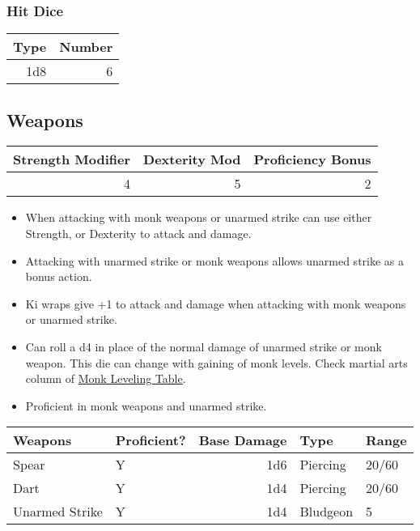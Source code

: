 \documentclass[11pt]{article}
\begin{document}
\subsubsection{Hit Dice}
\label{sec:org7c2fcab}

\begin{center}
\label{tab:orga5cebc1}
\begin{tabular}{rr}
Type & Number\\
\hline
1d8 & 6\\
\end{tabular}
\end{center}

\subsection{Weapons}
\label{sec:org0a9561d}

\begin{center}
\label{tab:org4721060}
\begin{tabular}{rrr}
Strength Modifier & Dexterity Mod & Proficiency Bonus\\
\hline
4 & 5 & 2\\
\end{tabular}
\end{center}

\begin{itemize}
\item When attacking with monk weapons or unarmed strike can use either Strength, or
Dexterity to attack and damage.
\item Attacking with unarmed strike or monk weapons allows unarmed strike as a bonus
action.
\item Ki wraps give +1 to attack and damage when attacking with monk weapons or
unarmed strike.
\item Can roll a d4 in place of the normal damage of unarmed strike or monk
weapon. This die can change with gaining of monk levels. Check martial arts
column of \href{http://engl393-dnd5th.wikia.com/wiki/Monk}{Monk Leveling Table}.
\item Proficient in monk weapons and unarmed strike.
\end{itemize}

\begin{center}
\label{tab:orgd96f3f5}
\begin{tabular}{llrll}
Weapons & Proficient? & Base Damage & Type & Range\\
\hline
Spear & Y & 1d6 & Piercing & 20/60\\
Dart & Y & 1d4 & Piercing & 20/60\\
Unarmed Strike & Y & 1d4 & Bludgeon & 5\\
\end{tabular}
\end{center}
\end{document}
